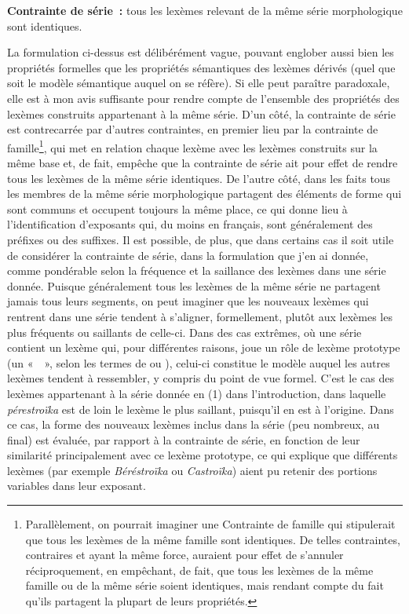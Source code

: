 \documentclass[output=paper]{langsci/langscibook}
\begin{document}
\ea\label{ex:Montermini:2} \textbf{Contrainte de série~:} tous les lexèmes relevant de la même
série morphologique sont identiques.
\z

La formulation ci-dessus est délibérément vague, pouvant englober aussi
bien les propriétés formelles que les propriétés sémantiques des lexèmes
dérivés (quel que soit le modèle sémantique auquel on se réfère). Si
elle peut paraître paradoxale, elle est à mon avis suffisante pour
rendre compte de l'ensemble des propriétés des lexèmes construits
appartenant à la même série. D'un côté, la contrainte de série est contrecarrée par
d'autres contraintes, en premier lieu par la contrainte de
famille\footnote{Parallèlement, on pourrait imaginer une Contrainte de
  famille qui stipulerait que tous les lexèmes de la même famille sont
  identiques. De telles contraintes, contraires et ayant la même
  force, auraient pour effet de s'annuler réciproquement, en empêchant,
  de fait, que tous les lexèmes de la même famille ou de la même série
  soient identiques, mais rendant compte du fait qu'ils partagent la
  plupart de leurs propriétés.}, qui met en relation chaque lexème avec
les lexèmes construits sur la même base et, de fait, empêche que la
contrainte de série ait pour effet de rendre tous les lexèmes de la même
série identiques. De l'autre côté, dans les faits tous les membres de la
même série morphologique partagent des éléments de forme qui sont
communs et occupent toujours la même place, ce qui donne lieu à
l'identification d'exposants qui, du moins en français, sont
généralement des préfixes ou des suffixes. Il est possible, de plus, que
dans certains cas il soit utile de considérer la contrainte de série,
dans la formulation que j'en ai donnée, comme pondérable selon la
fréquence et la saillance des lexèmes dans une série donnée. Puisque
généralement tous les lexèmes de la même série ne partagent jamais tous
leurs segments, on peut imaginer que les nouveaux lexèmes qui rentrent
dans une série tendent à s'aligner, formellement, plutôt aux lexèmes les
plus fréquents ou saillants de celle-ci. Dans des cas extrêmes, où une
série contient un lexème qui, pour différentes raisons, joue un rôle de
lexème prototype %
(un «~~», selon les termes de \citealt{Rainer2003} ou \citealt{Roche2011b}), celui-ci constitue le modèle auquel les autres lexèmes
tendent à ressembler, y compris du point de vue formel. C'est le cas des
lexèmes appartenant à la série donnée en (1) dans l'introduction, dans
laquelle \emph{pérestroïka} est de loin le lexème le plus saillant,
puisqu'il en est à l'origine. Dans ce cas, la forme des nouveaux lexèmes
inclus dans la série (peu nombreux, au final) est évaluée, par rapport à
la contrainte de série, en fonction de leur similarité principalement
avec ce lexème prototype, ce qui explique que différents lexèmes (par
exemple \emph{Béréstroïka} ou \emph{Castroïka}) aient pu retenir des
portions variables dans leur exposant.
\end{document}
